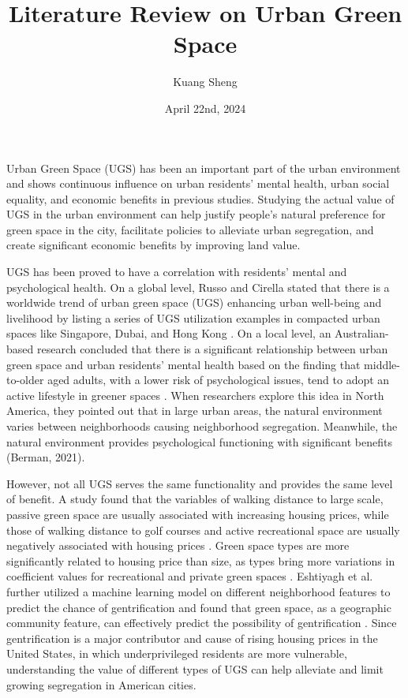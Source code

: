 \documentclass{article}
\title{Literature Review on Urban Green Space}
\author{Kuang Sheng}
\date{April 22nd, 2024}
\begin{document}
\maketitle

Urban Green Space (UGS) has been an important part of the urban environment and shows continuous influence on urban residents’ mental health, urban social equality, and economic benefits in previous studies. Studying the actual value of UGS in the urban environment can help justify people’s natural preference for green space in the city, facilitate policies to alleviate urban segregation, and create significant economic benefits by improving land value.

UGS has been proved to have a correlation with residents’ mental and psychological health. On a global level, Russo and Cirella stated that there is a worldwide trend of urban green space (UGS) enhancing urban well-being and livelihood by listing a series of UGS utilization examples in compacted urban spaces like Singapore, Dubai, and Hong Kong \cite{russo_modern_2018}. On a local level, an Australian-based research concluded that there is a significant relationship between urban green space and urban residents’ mental health based on the finding that middle-to-older aged adults, with a lower risk of psychological issues, tend to adopt an active lifestyle in greener spaces \cite{astell-burt_mental_2013}. When researchers explore this idea in North America, they pointed out that in large urban areas, the natural environment varies between neighborhoods causing neighborhood segregation. Meanwhile, the natural environment provides psychological functioning with significant benefits (Berman, 2021).

However, not all UGS serves the same functionality and provides the same level of benefit. A study found that the variables of walking distance to large scale, passive green space are usually associated with increasing housing prices, while those of walking distance to golf courses and active recreational space are usually negatively associated with housing prices \cite{kim_economic_2018}. Green space types are more significantly related to housing price than size, as types bring more variations in coefficient values for recreational and private green spaces \cite{chen_spatial_2022}. Eshtiyagh et al. further utilized a machine learning model on different neighborhood features to predict the chance of gentrification and found that green space, as a geographic community feature, can effectively predict the possibility of gentrification \cite{eshtiyagh_graph-based_2023}. Since gentrification is a major contributor and cause of rising housing prices in the United States, in which underprivileged residents are more vulnerable, understanding the value of different types of UGS can help alleviate and limit growing segregation in American cities.
\end{document}
